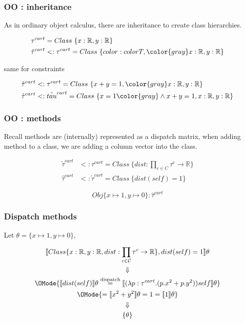 \documentclass[xcolor=dvipsnames]{beamer}
\begin{document}
\begin{frame}
  \frametitle{OO : inheritance}

  As in ordinary object calculus, there are inheritance to create class
  hierarchies.

  \begin{align*}
    \tau^{cart} & = Class \ \{ x : \mathbb{R} , y : \mathbb{R} \}\\
    \tilde{\tau}^{cart} & <: \tau^{cart} = Class \ \{ color : colorT, \color{gray} x : \mathbb{R} , y : \mathbb{R}\}
  \end{align*}

  same for constraints

  \begin{align*}
    \tilde{\tau}^{cart} & <: \tau^{cart} = Class \ \{ x + y = 1 , \color{gray} x : \mathbb{R} , y : \mathbb{R} \}\\
    \hat{\tau}^{cart}   & <: \tilde{tau}^{cart} = Class \ \{ x = 1  \color{gray} \land x + y = 1, x : \mathbb{R} , y : \mathbb{R} \}
  \end{align*}
  
  
\end{frame}

\begin{frame}
  \frametitle{OO : methods}

  Recall methods are (internally) represented as a dispatch matrix, when adding
  method to a class, we are adding a column vector into the class.

  \begin{align*}
    \tilde{\tau}^{cart} & <: \tau^{cart} = Class \ \{ dist : \prod_{c \in C} \tau^c \to \mathbb{R} \}\\
    \hat{\tau}^{cart} & <: \tilde{\tau}^{cart} = Class \ \{ dist(self) = 1\}
  \end{align*}

  \pause

  \[
    Obj \{ x \mapsto 1 , y \mapsto 0\} : \hat{\tau}^{cart}
  \]

\end{frame}

\begin{frame}
  \frametitle{Dispatch methods}

  Let $\theta = \{x \mapsto 1 , y \mapsto 0\}$,

  \begin{gather*}
    \llbracket Class \{ x : \mathbb{R} , y : \mathbb{R} , dist : \prod_{c \in
      \mathcal{C}} \tau^c \to \mathbb{R}\} , dist(self) = 1  \rrbracket\theta\\
    \Downarrow\\
    \OMode{\llbracket dist(self) \rrbracket\theta \stackrel{\text{dispatch}}{=}
      \llbracket (\lambda p : \tau^{cart} . (p.x^2 + p.y^2)) self
      \rrbracket\theta}\\
    \OMode{= \llbracket x^2 + y^2 \rrbracket\theta = 1 = \llbracket 1
      \rrbracket\theta}\\
    \Downarrow\\
    \{ \theta \}
  \end{gather*}
  
\end{frame}
\end{document}
